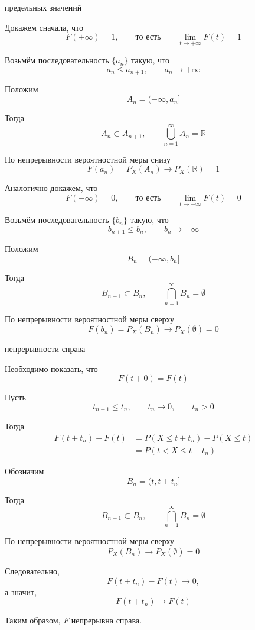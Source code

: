 \documentclass[12pt,a4paper]{article}
\begin{document}
\begin{proofbox}{предельных значений}

Докажем сначала, что
\[
F(+\infty)=1,
\qquad\text{то есть}\qquad
\lim_{t\to+\infty}F(t)=1
\]

Возьмём последовательность $\{a_n\}$ такую, что
\[
a_n\leq a_{n+1},
\qquad
a_n\to+\infty
\]

Положим
\[
A_n=(-\infty,a_n]
\]

Тогда
\[
A_n\subset A_{n+1},
\qquad
\bigcup_{n=1}^{\infty}A_n=\mathbb{R}
\]

По непрерывности вероятностной меры снизу
\[
F(a_n)=P_X(A_n)\longrightarrow P_X(\mathbb{R})=1
\]

Аналогично докажем, что
\[
F(-\infty)=0,
\qquad\text{то есть}\qquad
\lim_{t\to-\infty}F(t)=0
\]

Возьмём последовательность $\{b_n\}$ такую, что
\[
b_{n+1}\leq b_n,
\qquad
b_n\to-\infty
\]

Положим
\[
B_n=(-\infty,b_n]
\]

Тогда
\[
B_{n+1}\subset B_n,
\qquad
\bigcap_{n=1}^{\infty}B_n=\emptyset
\]

По непрерывности вероятностной меры сверху
\[
F(b_n)=P_X(B_n)\longrightarrow P_X(\emptyset)=0
\]

\end{proofbox}

\begin{proofbox}{непрерывности справа}

Необходимо показать, что
\[
F(t+0)=F(t)
\]

Пусть
\[
t_{n+1}\leq t_n,
\qquad
t_n\to0,
\qquad
t_n>0
\]

Тогда
\[
\begin{aligned}
F(t+t_n)-F(t)
&=P(X\leq t+t_n)-P(X\leq t)\\
&=P(t<X\leq t+t_n)
\end{aligned}
\]

Обозначим
\[
B_n=(t,t+t_n]
\]

Тогда
\[
B_{n+1}\subset B_n,
\qquad
\bigcap_{n=1}^{\infty}B_n=\emptyset
\]

По непрерывности вероятностной меры сверху
\[
P_X(B_n)\longrightarrow P_X(\emptyset)=0
\]

Следовательно,
\[
F(t+t_n)-F(t)\longrightarrow0,
\]
а значит,
\[
F(t+t_n)\longrightarrow F(t)
\]

Таким образом, $F$ непрерывна справа.

\end{proofbox}
\end{document}
